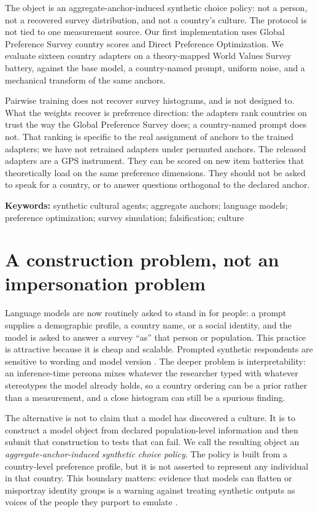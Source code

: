 \documentclass[10pt,letterpaper]{article}
\begin{document}
The object is an aggregate-anchor-induced synthetic choice policy: not a person, not a recovered survey distribution, and not a country's culture. The protocol is not tied to one measurement source. Our first implementation uses Global Preference Survey country scores and Direct Preference Optimization. We evaluate sixteen country adapters on a theory-mapped World Values Survey battery, against the base model, a country-named prompt, uniform noise, and a mechanical transform of the same anchors.

Pairwise training does not recover survey histograms, and is not designed to. What the weights recover is preference direction: the adapters rank countries on trust the way the Global Preference Survey does; a country-named prompt does not. That ranking is specific to the real assignment of anchors to the trained adapters; we have not retrained adapters under permuted anchors. The released adapters are a GPS instrument. They can be scored on new item batteries that theoretically load on the same preference dimensions. They should not be asked to speak for a country, or to answer questions orthogonal to the declared anchor.

\noindent\textbf{Keywords:} synthetic cultural agents; aggregate anchors; language models; preference optimization; survey simulation; falsification; culture

\section{A construction problem, not an impersonation problem}
Language models are now routinely asked to stand in for people: a prompt supplies a demographic profile, a country name, or a social identity, and the model is asked to answer a survey ``as'' that person or population. This practice is attractive because it is cheap and scalable. Prompted synthetic respondents are sensitive to wording and model version \cite{argyle2023,bisbee2024,dalloul2026}. The deeper problem is interpretability: an inference-time persona mixes whatever the researcher typed with whatever stereotypes the model already holds, so a country ordering can be a prior rather than a measurement, and a close histogram can still be a spurious finding.

The alternative is not to claim that a model has discovered a culture. It is to construct a model object from declared population-level information and then submit that construction to tests that can fail. We call the resulting object an \emph{aggregate-anchor-induced synthetic choice policy}. The policy is built from a country-level preference profile, but it is not asserted to represent any individual in that country. This boundary matters: evidence that models can flatten or misportray identity groups is a warning against treating synthetic outputs as voices of the people they purport to emulate \cite{wang2025}.
\end{document}
